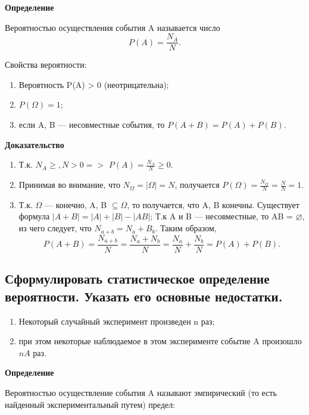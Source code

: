 \textbf{Определение}

Вероятностью осуществления события A называется число 
\begin{equation}
	P(A) = \frac{N_A}{N}.
\end{equation}

Свойства вероятности:

\begin{enumerate}
	\item Вероятность P(A) > 0 (неотрицательна);
	\item $P(\Omega) = 1$;
	\item если A, B --- несовместные события, то $P(A+B) = P(A) + P(B)$.
\end{enumerate}

\textbf{Доказательство}

\begin{enumerate}
	\item Т.к. $N_A \geqslant, N > 0 => $ $P(A) = \frac{N_A}{N} \geqslant 0.$
	\item Принимая во внимание, что $N_{\Omega} = |\Omega| = N$, получается $P(\Omega) = \frac{N_{\Omega}}{N} = \frac{N}{N} = 1$.
	\item  Т.к. $\Omega$ --- конечно, A, B $\subseteq \Omega$, то получается, что A, B конечны. Существует формула $|A + B| = |A| + |B| - |AB|$;
	Т.к A и B --- несовместные, то AB = $\varnothing$, из чего следует, что $N_{a+b} = N_a + B_b$. Таким образом,
	\begin{equation}
		P(A +B) = \frac{N_{a+b}}{N} = \frac{N_{a} + N_{b}}{N} = \frac{N_{a} }{N} + \frac{N_{b} }{N} = P(A) + P(B).
	\end{equation}
\end{enumerate}

\subsection{Сформулировать статистическое определение вероятности. Указать его основные недостатки.}

\begin{enumerate}
	\item Некоторый случайный эксперимент произведен n раз;
	\item при этом некоторые наблюдаемое в этом эксперименте событие A произошло $nA$ раз.
\end{enumerate}

\textbf{Определение}

Вероятностью осуществление события A называют эмпирический (то есть найденный экспериментальный путем) предел: 

